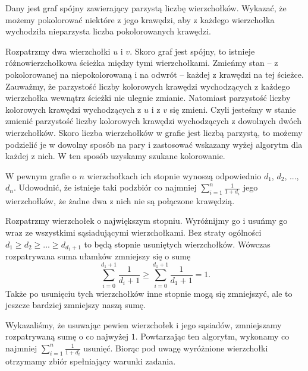 \newpage

\begin{problem}{4}
	Dany jest graf spójny zawierający parzystą liczbę wierzchołków. Wykazać, że możemy pokolorować niektóre z jego krawędzi, aby z każdego wierzchołka wychodziła nieparzysta liczba pokolorowanych krawędzi.
\end{problem}

\noindent
Rozpatrzmy dwa wierzchołki $u$ i $v$. Skoro graf jest spójny, to istnieje różnowierzchołkowa ścieżka między tymi wierzchołkami. Zmieńmy stan -- z pokolorowanej na niepokolorowaną i na odwrót --  każdej z krawędzi na tej ścieżce. Zauważmy, że parzystość liczby kolorowych krawędzi wychodzących z każdego wierzchołka wewnątrz ścieżki nie ulegnie zmianie. Natomiast parzystość liczby kolorowych krawędzi wychodzących z $u$ i z $v$ się zmieni. Czyli jesteśmy w stanie zmienić parzystość liczby kolorowych krawędzi wychodzących z dowolnych dwóch wierzchołków. Skoro liczba wierzchołków w grafie jest liczbą parzystą, to możemy podzielić je w dowolny sposób na pary i zastosować wskazany wyżej algorytm dla każdej z nich. W ten sposób uzyskamy szukane kolorowanie.

\vspace{5px}

\begin{problem}{5}
	W pewnym grafie o $n$ wierzchołkach ich stopnie wynoszą odpowiednio $d_1$, $d_2$, ..., $d_n$. Udowodnić, że istnieje taki podzbiór co najmniej $\sum^{n}_{i = 1} \frac{1}{1 + d_i}$ jego wierzchołków, że żadne dwa z nich nie są połączone krawędzią.
\end{problem}

\noindent
Rozpatrzmy wierzchołek o największym stopniu. Wyróżnijmy go i usuńmy go wraz ze wszystkimi sąsiadującymi wierzchołkami. Bez straty ogólności $d_1 \geqslant d_2 \geqslant ... \geqslant d_{d_1 + 1}$ to będą stopnie usuniętych wierzchołków. Wówczas rozpatrywana suma ułamków zmniejszy się o sumę
\[
	\sum^{d_1 + 1}_{i = 0} \frac{1}{d_i + 1} \geqslant \sum^{d_1 + 1}_{i = 0} \frac{1}{d_1 + 1} = 1.
\]
Także po usunięciu tych wierzchołków inne stopnie mogą się zmniejszyć, ale to jeszcze bardziej zmniejszy naszą sumę.

Wykazaliśmy, że usuwając pewien wierzchołek i jego sąsiadów, zmniejszamy rozpatrywaną sumę o co najwyżej $1$. Powtarzając ten algorytm, wykonamy co najmniej $\sum^{n}_{i = 1} \frac{1}{1 + d_i}$ usunięć. Biorąc pod uwagę wyróżnione wierzchołki otrzymamy zbiór spełniający warunki zadania.


